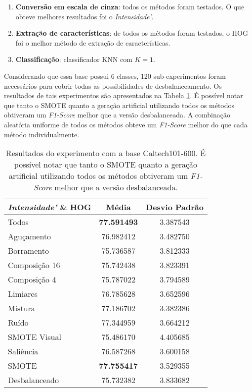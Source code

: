 \begin{enumerate}
\item \textbf{Conversão em escala de cinza}: todos os métodos foram testados. O que obteve melhores resultados foi o \textit{Intensidade'}.
\item \textbf{Extração de características}: de todos os métodos foram testados, o HOG foi o melhor método de extração de características.
\item \textbf{Classificação}: classificador KNN com $K=1$.
\end{enumerate}


Considerando que essa base possui 6 classes, 120 sub-experimentos foram necessários para cobrir todas as possibilidades de desbalanceamento. Os resultados de tais experimentos são apresentados na Tabela \ref{tab:resultados:3.2}. É possível notar que tanto o SMOTE quanto a geração artificial utilizando todos os métodos obtiveram um \textit{F1-Score} melhor que a versão desbalanceada. A combinação aleatória uniforme de todos os métodos obteve um \textit{F1-Score} melhor do que cada método individualmente.

\begin{table}[!htbp]
\begin{center}
\caption{Resultados do experimento com a base Caltech101-600. É possível notar que tanto o SMOTE quanto a geração artificial utilizando todos os métodos obtiveram um \textit{F1-Score} melhor que a versão desbalanceada.}
\label{tab:resultados:3.2}
\begin{tabular}{|l|c|c|}
\hline
\textbf{\emph{Intensidade'} \& HOG} & \textbf{Média} & \textbf{Desvio Padrão} \\ \hline
   Todos        &  \textbf{77.591493} &  3.387543  \\ \hline
  Aguçamento    &  76.982412 &  3.482750  \\ \hline
  Borramento    &  75.736587 &  3.812333  \\ \hline
  Composição 16 &  75.742438 &  3.823391  \\ \hline
  Composição 4  &  75.787022 &  3.794589  \\ \hline
  Limiares      &  76.785628 &  3.652596  \\ \hline
  Mistura       &  77.186702 &  3.382386  \\ \hline
  Ruído         &  77.344959 &  3.664212  \\ \hline
  SMOTE Visual  &  75.486170 &  4.405685  \\ \hline
  Saliência     &  76.587268 &  3.600158  \\ \hline
 SMOTE          &  \textbf{77.755417} &  3.529355  \\ \hline
Desbalanceado   &  75.732382 &  3.833682  \\ \hline
\end{tabular}
\end{center}
\end{table}

